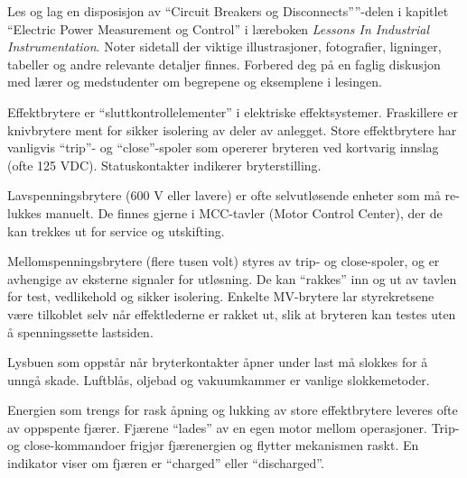 

Les og lag en disposisjon av ``Circuit Breakers og Disconnects''''-delen i kapitlet ``Electric Power Measurement og Control'' i læreboken {\it Lessons In Industrial Instrumentation}. Noter sidetall der viktige illustrasjoner, fotografier, ligninger, tabeller og andre relevante detaljer finnes. Forbered deg på en faglig diskusjon med lærer og medstudenter om begrepene og eksemplene i lesingen.













Effektbrytere er ``sluttkontrollelementer'' i elektriske effektsystemer. Fraskillere er knivbrytere ment for sikker isolering av deler av anlegget. Store effektbrytere har vanligvis ``trip''- og ``close''-spoler som opererer bryteren ved kortvarig innslag (ofte 125 VDC). Statuskontakter indikerer bryterstilling.

\vskip 10pt

Lavspenningsbrytere (600 V eller lavere) er ofte selvutløsende enheter som må re-lukkes manuelt. De finnes gjerne i MCC-tavler (Motor Control Center), der de kan trekkes ut for service og utskifting.

\vskip 10pt

Mellomspenningsbrytere (flere tusen volt) styres av trip- og close-spoler, og er avhengige av eksterne signaler for utløsning. De kan ``rakkes'' inn og ut av tavlen for test, vedlikehold og sikker isolering. Enkelte MV-brytere lar styrekretsene være tilkoblet selv når effektlederne er rakket ut, slik at bryteren kan testes uten å spenningssette lastsiden.

Lysbuen som oppstår når bryterkontakter åpner under last må slokkes for å unngå skade. Luftblås, oljebad og vakuumkammer er vanlige slokkemetoder.

Energien som trengs for rask åpning og lukking av store effektbrytere leveres ofte av oppspente fjærer. Fjærene ``lades'' av en egen motor mellom operasjoner. Trip- og close-kommandoer frigjør fjærenergien og flytter mekanismen raskt. En indikator viser om fjæren er ``charged'' eller ``discharged''.

